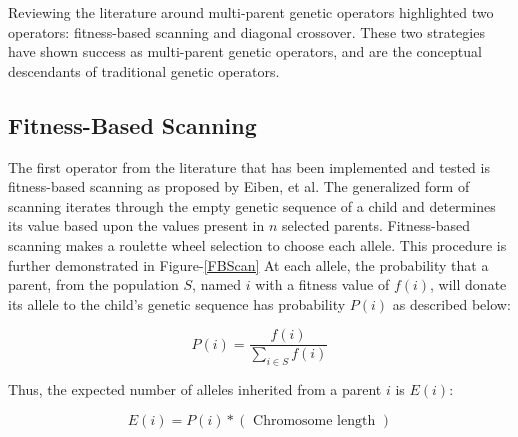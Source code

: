 Reviewing the literature around multi-parent genetic operators highlighted two operators: fitness-based scanning and diagonal crossover. These two strategies have shown success as multi-parent genetic operators, and are the conceptual descendants of traditional genetic operators.

\subsection*{Fitness-Based Scanning}
The first operator from the literature that has been implemented and tested is fitness-based scanning as proposed by Eiben, et al\cite{Eiben94}. The generalized form of scanning iterates through the empty genetic sequence of a child and determines its value based upon the values present in $n$ selected parents\cite{Eiben91}. Fitness-based scanning makes a roulette wheel selection to choose each allele. This procedure is further demonstrated in Figure-\ref{FBScan} At each allele, the probability that a parent, from the population $S$, named $i$ with a fitness value of $f(i)$, will donate its allele to the child's genetic sequence has probability $P(i)$ as described below\cite{Eiben94}: 

\[ P(i) = \frac{f(i)}{\sum\limits_{i \in S} f(i)} \]

\noindent Thus, the expected number of alleles inherited from a parent $i$ is $E(i)$\cite{Eiben94}:

\[ E(i) = P(i) *(\text{ Chromosome length }) \]


